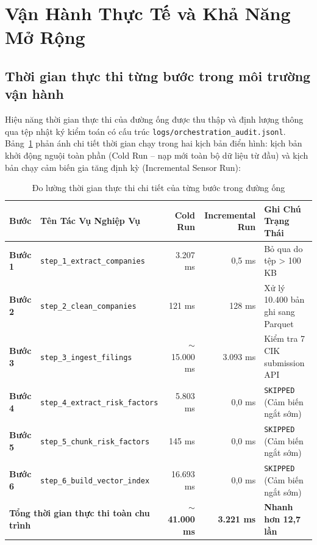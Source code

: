 \section{Vận Hành Thực Tế và Khả Năng Mở Rộng}

\subsection{Thời gian thực thi từng bước trong môi trường vận hành}
Hiệu năng thời gian thực thi của đường ống được thu thập và định lượng thông qua tệp nhật ký kiểm toán có cấu trúc \texttt{logs/orchestration\_audit.jsonl}. Bảng~\ref{tab:execution_times} phản ánh chi tiết thời gian chạy trong hai kịch bản điển hình: kịch bản khởi động nguội toàn phần (Cold Run -- nạp mới toàn bộ dữ liệu từ đầu) và kịch bản chạy cảm biến gia tăng định kỳ (Incremental Sensor Run):

\begin{table}[htbp]
\centering
\scriptsize
\setlength{\tabcolsep}{3pt}
\caption{Đo lường thời gian thực thi chi tiết của từng bước trong đường ống}
\label{tab:execution_times}
\begin{tabularx}{\textwidth}{l p{3.8cm} r r X}
\toprule
\textbf{Bước} & \textbf{Tên Tác Vụ Nghiệp Vụ} & \textbf{Cold Run} & \textbf{Incremental Run} & \textbf{Ghi Chú Trạng Thái} \\
\midrule
\textbf{Bước 1} & \texttt{step\_1\_extract\_companies} & 3.207 ms & 0,5 ms & Bỏ qua do tệp > 100 KB \\
\textbf{Bước 2} & \texttt{step\_2\_clean\_companies} & 121 ms & 128 ms & Xử lý 10.400 bản ghi sang Parquet \\
\textbf{Bước 3} & \texttt{step\_3\_ingest\_filings} & $\sim$15.000 ms & 3.093 ms & Kiểm tra 7 CIK submission API \\
\textbf{Bước 4} & \texttt{step\_4\_extract\_risk\_factors} & 5.803 ms & 0,0 ms & \texttt{SKIPPED} (Cảm biến ngắt sớm) \\
\textbf{Bước 5} & \texttt{step\_5\_chunk\_risk\_factors} & 145 ms & 0,0 ms & \texttt{SKIPPED} (Cảm biến ngắt sớm) \\
\textbf{Bước 6} & \texttt{step\_6\_build\_vector\_index} & 16.693 ms & 0,0 ms & \texttt{SKIPPED} (Cảm biến ngắt sớm) \\
\midrule
\multicolumn{2}{l}{\textbf{Tổng thời gian thực thi toàn chu trình}} & \textbf{$\sim$41.000 ms} & \textbf{3.221 ms} & \textbf{Nhanh hơn 12,7 lần} \\
\bottomrule
\end{tabularx}
\end{table}

